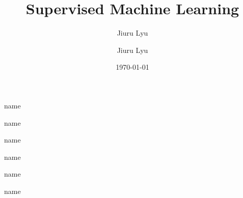 \documentclass[12pt,a4paper]{article}
\title{Supervised Machine Learning}
\author{Jiuru Lyu}
\date{ }
\title{\textbf{}}
\author{Jiuru Lyu}
\date{\today}
\begin{document}
\begin{defbox}{name}
	
\end{defbox}

\begin{egbox}{name}
	
\end{egbox}
	
\begin{thmbox}{name}
	
\end{thmbox}

\begin{prfbox}{name}
	
\end{prfbox}

\begin{extbox}{name}
	
\end{extbox}

\begin{rmkbox}{name}
	
\end{rmkbox}
\end{document}
